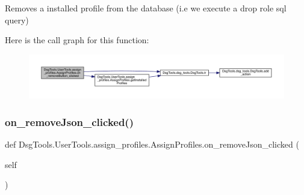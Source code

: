 \begin{DoxyVerb}Removes a installed profile from the database (i.e we execute a drop role sql query)
\end{DoxyVerb}
 Here is the call graph for this function\+:
\nopagebreak
\begin{figure}[H]
\begin{center}
\leavevmode
\includegraphics[width=350pt]{class_dsg_tools_1_1_user_tools_1_1assign__profiles_1_1_assign_profiles_a0b757b8d4a1278a01c6dd48034a194c6_cgraph}
\end{center}
\end{figure}
\mbox{\label{class_dsg_tools_1_1_user_tools_1_1assign__profiles_1_1_assign_profiles_aab8b73d37d5f05c22f96d45661facd38}} 
\subsubsection{\texorpdfstring{on\+\_\+remove\+Json\+\_\+clicked()}{on\_removeJson\_clicked()}}
{\footnotesize\ttfamily def Dsg\+Tools.\+User\+Tools.\+assign\+\_\+profiles.\+Assign\+Profiles.\+on\+\_\+remove\+Json\+\_\+clicked (\begin{DoxyParamCaption}\item[{}]{self }\end{DoxyParamCaption})}

